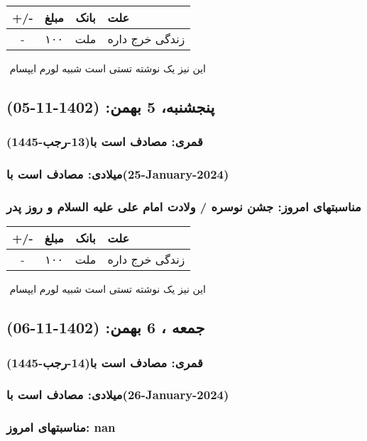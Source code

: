 \documentclass{article}
\newcommand{\rnote}[1]{\marginpar{\textcolor{color}{\StrSubstitute{\##1}{ }{\_}}}}
\newcommand{\myRow}[4]{
    #1 & #2 & #3 & #4 \\ \hline
}
\begin{document}
\begin{tabular}{ | c | c | c | p{5cm} |}
    \hline
    \myRow{ +/- }{مبلغ}{بانک}{علت}
    \myRow{-}{۱۰۰}{ملت}{زندگی خرج داره}
\end{tabular}
\newline
\newline

‌
\rnote{تست}
این نیز یک نوشته تستی است شبیه لورم ایپسام




\newpage
{}
\textcolor{color}{
\section{ پنجشنبه، 5 بهمن: (1402-11-05) }
\subsubsection*{قمری: مصادف است با(13-رجب-1445)} 
\subsubsection*{میلادی: مصادف است با(25-January-2024)}
\subsubsection*{مناسبتهای امروز: جشن نوسره /  ولادت امام علی علیه السلام و روز پدر }
}


\begin{tabular}{ | c | c | c | p{5cm} |}
    \hline
    \myRow{ +/- }{مبلغ}{بانک}{علت}
    \myRow{-}{۱۰۰}{ملت}{زندگی خرج داره}
\end{tabular}
\newline
\newline

‌
\rnote{تست}
این نیز یک نوشته تستی است شبیه لورم ایپسام




\newpage
{}
\textcolor{color}{
\section{ جمعه ، 6 بهمن: (1402-11-06) }
\subsubsection*{قمری: مصادف است با(14-رجب-1445)} 
\subsubsection*{میلادی: مصادف است با(26-January-2024)}
\subsubsection*{مناسبتهای امروز: nan}
}
\end{document}
